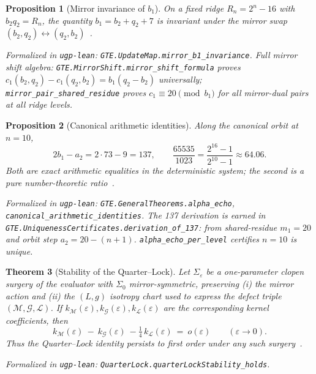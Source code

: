 \documentclass[12pt]{article}
\newtheorem{theorem}{Theorem}[section]
\newtheorem{proposition}[theorem]{Proposition}
\numberwithin{equation}{section}
\newcommand{\M}{\mathcal{M}}
\newcommand{\G}{\mathcal{G}}
\newcommand{\LL}{\mathcal{L}}
\begin{document}
\begin{proposition}[Mirror invariance of $b_1$]\label{prop:mirror-b1}
On a fixed ridge $R_n=2^n-16$ with $b_2 q_2=R_n$, the quantity $b_1=b_2+q_2+7$ is invariant under the mirror swap $(b_2,q_2)\leftrightarrow(q_2,b_2)$~\cite{SpivackUGPFormalization,ugp-lean}.

\noindent\emph{Formalized in} \texttt{ugp-lean}: \texttt{GTE.UpdateMap.mirror\_b1\_invariance}.
Full mirror shift algebra: \texttt{GTE.MirrorShift.mirror\_shift\_formula} proves
$c_1(b_2,q_2)-c_1(q_2,b_2)=b_1(q_2-b_2)$ universally; \texttt{mirror\_pair\_shared\_residue}
proves $c_1\equiv 20\pmod{b_1}$ for all mirror-dual pairs at all ridge levels.
\end{proposition}

\begin{proposition}[Canonical arithmetic identities]\label{prop:alpha-echo}
Along the canonical orbit at $n=10$,
\[
2 b_1 - a_2 = 2\cdot 73 - 9 = 137,\qquad
\frac{65535}{1023} = \frac{2^{16}-1}{2^{10}-1} \approx 64.06.
\]
Both are exact arithmetic equalities in the deterministic system; the second is a pure number-theoretic ratio~\cite{SpivackUGPFormalization,ugp-lean}.

\noindent\emph{Formalized in} \texttt{ugp-lean}: \texttt{GTE.GeneralTheorems.alpha\_echo},
\texttt{canonical\_arithmetic\_identities}. The 137 derivation is earned in
\texttt{GTE.UniquenessCertificates.derivation\_of\_137}: from shared-residue $m_1=20$
and orbit step $a_2=20-(n+1)$. \texttt{alpha\_echo\_per\_level} certifies $n=10$ is unique.
\end{proposition}

\begin{theorem}[Stability of the Quarter--Lock]\label{thm:QL-stability}
Let $\Sigma_\varepsilon$ be a one-parameter clopen surgery of the evaluator with $\Sigma_0$ mirror-symmetric, preserving (i) the mirror action and (ii) the $(L,g)$ isotropy chart used to express the defect triple $(\M,\G,\LL)$. If $k_{\M}(\varepsilon),k_{\G}(\varepsilon),k_{\LL}(\varepsilon)$ are the corresponding kernel coefficients, then
\[
k_{\M}(\varepsilon)\ -\ k_{\G}(\varepsilon)\ -\tfrac14\,k_{\LL}(\varepsilon)\ =\ o(\varepsilon)\qquad(\varepsilon\to 0).
\]
Thus the Quarter--Lock identity persists to first order under any such surgery~\cite{SpivackUGPFormalization,ugp-lean}.

\noindent\emph{Formalized in} \texttt{ugp-lean}: \texttt{QuarterLock.quarterLockStability\_holds}.
\end{theorem}
\end{document}
